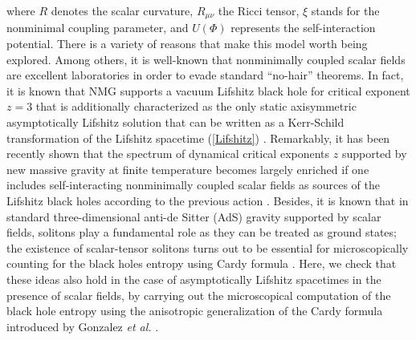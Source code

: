 \documentclass[prd,twocolumn,superscriptaddress,amsmath,amssymb,nofootinbib]{revtex4-1}
\begin{document}
where $R$ denotes the scalar curvature, $R_{\mu\nu}$ the Ricci
tensor, $\xi$ stands for the nonminimal coupling parameter, and
$U(\Phi)$ represents the self-interaction potential. There is a
variety of reasons that make this model worth being
explored. Among others, it is well-known that nonminimally
coupled scalar fields are excellent laboratories in order to
evade standard ``no-hair'' theorems. In fact, it is known that
NMG supports a vacuum Lifshitz black hole for critical exponent
$z=3$ \cite{AyonBeato:2009nh} that is additionally
characterized as the only static axisymmetric asymptotically
Lifshitz solution that can be written as a Kerr-Schild
transformation of the Lifshitz spacetime (\ref{Lifshitz})
\cite{Ayon-Beato:2014wla}. Remarkably, it has been recently
shown that the spectrum of dynamical critical exponents $z$
supported by new massive gravity at finite temperature becomes
largely enriched if one includes self-interacting nonminimally
coupled scalar fields as sources of the Lifshitz black holes
according to the previous action \cite{Correa:2014ika}.
Besides, it is known that in standard three-dimensional anti-de Sitter (AdS)
gravity supported by scalar fields, solitons play a fundamental
role as they can be treated as ground states; the existence of
scalar-tensor solitons turns out to be essential for
microscopically counting for the black holes entropy using
Cardy formula \cite{Correa:2010hf}. Here, we check that these
ideas also hold in the case of asymptotically Lifshitz
spacetimes in the presence of scalar fields, by carrying out
the microscopical computation of the black hole entropy using
the anisotropic generalization of the Cardy formula introduced
by Gonzalez \emph{et al.} \cite{Gonzalez:2011nz}.
\end{document}

